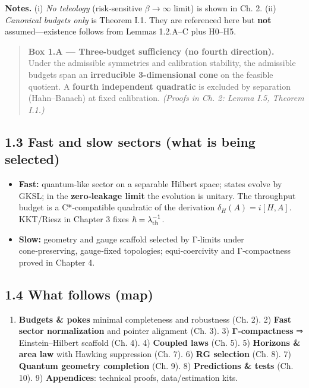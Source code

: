 \documentclass[
]{article}
\providecommand{\tightlist}{%
  \setlength{\itemsep}{0pt}\setlength{\parskip}{0pt}}
\numberwithin{equation}{section}
\begin{document}
\textbf{Notes.} (i) \emph{No teleology} (risk‑sensitive
\(\beta\to\infty\) limit) is shown in Ch. 2. (ii) \emph{Canonical
budgets only} is Theorem I.1. They are referenced here but \textbf{not}
assumed---existence follows from Lemmas 1.2.A--C plus H0--H5.

\begin{quote}
\textbf{Box 1.A --- Three-budget sufficiency (no fourth direction).}\\
Under the admissible symmetries and calibration stability, the
admissible budgets span an \textbf{irreducible 3-dimensional cone} on
the feasible quotient. A \textbf{fourth independent quadratic} is
excluded by separation (Hahn--Banach) at fixed calibration.
\emph{(Proofs in Ch. 2: Lemma I.5, Theorem I.1.)}
\end{quote}

\hypertarget{fast-and-slow-sectors-what-is-being-selected}{%
\subsection{1.3 Fast and slow sectors (what is being
selected)}\label{fast-and-slow-sectors-what-is-being-selected}}

\begin{itemize}
\tightlist
\item
  \textbf{Fast:} quantum‑like sector on a separable Hilbert space;
  states evolve by GKSL; in the \textbf{zero‑leakage limit} the
  evolution is unitary. The throughput budget is a C*‑compatible
  quadratic of the derivation \(\delta_H(A)=i[H,A]\). KKT/Riesz in
  Chapter 3 fixes \(\hbar=\lambda_{\rm th}^{-1}\).
\item
  \textbf{Slow:} geometry and gauge scaffold selected by Γ‑limits under
  cone‑preserving, gauge‑fixed topologies; equi‑coercivity and
  Γ‑compactness proved in Chapter 4.
\end{itemize}

\hypertarget{what-follows-map}{%
\subsection{1.4 What follows (map)}\label{what-follows-map}}

\begin{enumerate}
\def\labelenumi{\arabic{enumi}.}
\tightlist
\item
  \textbf{Budgets \& pokes} minimal completeness and robustness (Ch. 2).
  2) \textbf{Fast sector normalization} and pointer alignment (Ch. 3).
  3) \textbf{Γ‑compactness} ⇒ Einstein--Hilbert scaffold (Ch. 4). 4)
  \textbf{Coupled laws} (Ch. 5). 5) \textbf{Horizons \& area law} with
  Hawking suppression (Ch. 7). 6) \textbf{RG selection} (Ch. 8). 7)
  \textbf{Quantum geometry completion} (Ch. 9). 8) \textbf{Predictions
  \& tests} (Ch. 10). 9) \textbf{Appendices}: technical proofs,
  data/estimation kits.
\end{enumerate}
\end{document}
